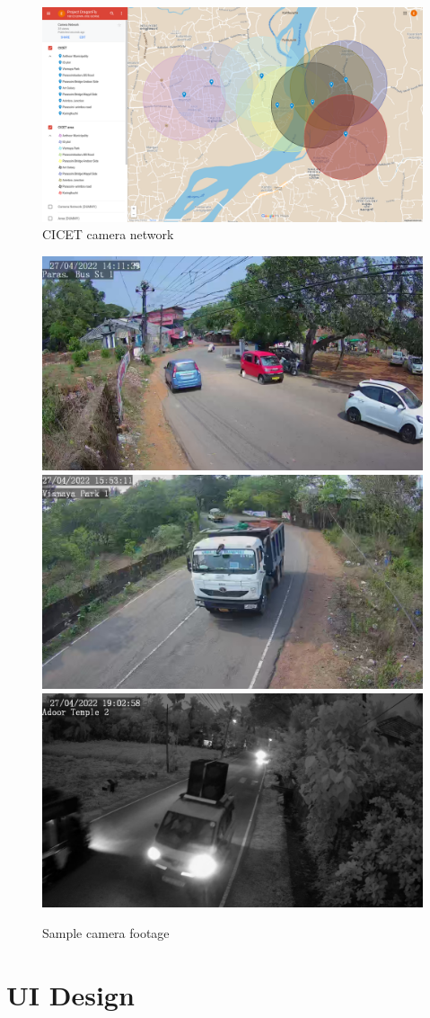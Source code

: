 \begin{figure}[!ht]
	\centering
	\includegraphics[width=\linewidth]{Images/camera-network}
	\caption{CICET camera network}
	\label{fig:camera-network}
\end{figure}

\begin{figure}[!ht]
	\centering
	\includegraphics[width=0.32\linewidth]{Images/camera_footage/footage1} \hfill
	\includegraphics[width=0.32\linewidth]{Images/camera_footage/footage2} \hfill
	\includegraphics[width=0.32\linewidth]{Images/camera_footage/night1} \hfill
	\caption{Sample camera footage}
\end{figure}


\section{UI Design}

